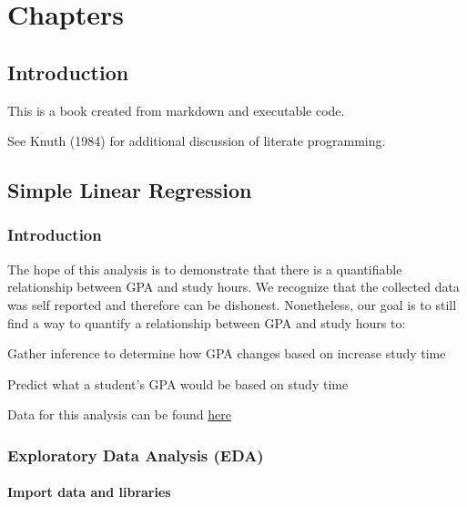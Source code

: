 \documentclass[
  letterpaper,
  DIV=11,
  numbers=noendperiod]{scrreprt}
\begin{document}
\part{Chapters}

\hypertarget{introduction}{%
\chapter{Introduction}\label{introduction}}

This is a book created from markdown and executable code.

See Knuth (1984) for additional discussion of literate programming.

\hypertarget{simple-linear-regression}{%
\chapter{Simple Linear Regression}\label{simple-linear-regression}}

\hypertarget{introduction-1}{%
\section{Introduction}\label{introduction-1}}

The hope of this analysis is to demonstrate that there is a quantifiable
relationship between GPA and study hours. We recognize that the
collected data was self reported and therefore can be dishonest.
Nonetheless, our goal is to still find a way to quantify a relationship
between GPA and study hours to:

Gather inference to determine how GPA changes based on increase study
time

Predict what a student's GPA would be based on study time

Data for this analysis can be found
\href{https://www.kaggle.com/datasets/joebeachcapital/gpa-study-hours}{here}

\hypertarget{exploratory-data-analysis-eda}{%
\section{Exploratory Data Analysis
(EDA)}\label{exploratory-data-analysis-eda}}

\hypertarget{import-data-and-libraries}{%
\subsection{Import data and libraries}\label{import-data-and-libraries}}
\end{document}

